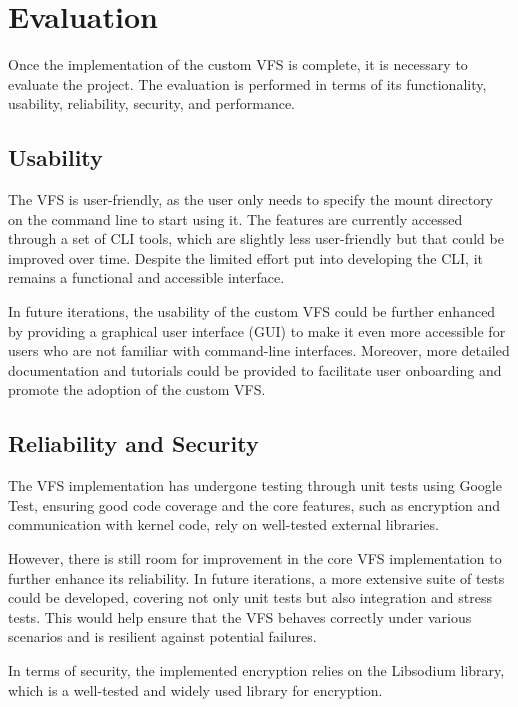 \chapter{Evaluation}\label{chap:evaluation}

Once the implementation of the custom VFS is complete, it is necessary to evaluate the project.
The evaluation is performed in terms of its functionality, usability, reliability, security, and performance.


\section{Usability}\label{sec:usability}

The VFS is user-friendly, as the user only needs to specify the mount directory on the command line to start using it.
The features are currently accessed through a set of CLI tools, which are slightly less user-friendly but that could be improved over time.
Despite the limited effort put into developing the CLI, it remains a functional and accessible interface.

In future iterations, the usability of the custom VFS could be further enhanced by providing a graphical user interface (GUI) to make it even more accessible for users who are not familiar with command-line interfaces.
Moreover, more detailed documentation and tutorials could be provided to facilitate user onboarding and promote the adoption of the custom VFS\@.


\section{Reliability and Security}\label{sec:reliability-and-security}

The VFS implementation has undergone testing through unit tests using Google Test, ensuring good code coverage and the core features, such as encryption and communication with kernel code, rely on well-tested external libraries.

However, there is still room for improvement in the core VFS implementation to further enhance its reliability.
In future iterations, a more extensive suite of tests could be developed, covering not only unit tests but also integration and stress tests.
This would help ensure that the VFS behaves correctly under various scenarios and is resilient against potential failures.

In terms of security, the implemented encryption relies on the Libsodium library, which is a well-tested and widely used library for encryption.


